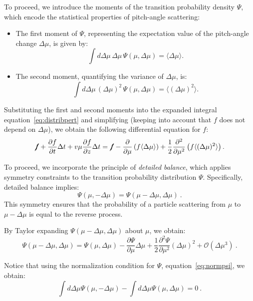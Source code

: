 To proceed, we introduce the moments of the transition probability density \( \Psi \), which encode the statistical properties of pitch-angle scattering:
%
\begin{itemize}
\item The first moment of \( \Psi \), representing the expectation value of the pitch-angle change \( \Delta \mu \), is given by:
\[
\int d\Delta \mu \, \Delta \mu \, \Psi(\mu, \Delta \mu) = \langle \Delta \mu \rangle.
\]
\item The second moment, quantifying the variance of \( \Delta \mu \), is:
\[
\int d\Delta \mu \, (\Delta \mu)^2 \, \Psi(\mu, \Delta \mu) = \langle (\Delta \mu)^2 \rangle.
\]
\end{itemize}

Substituting the first and second moments into the expanded integral equation~\eqref{eq:distribpert} and simplifying (keeping into account that  \( f \) does not depend on \( \Delta \mu \)), we obtain the following differential equation for \( f \):
%
\begin{equation}
\cancel{f} + \frac{\partial f}{\partial t} \Delta t + v \mu \frac{\partial f}{\partial z} \Delta t = 
\cancel{f} -\frac{\partial}{\partial \mu} \left( f \langle \Delta \mu \rangle \right) + \frac{1}{2} \frac{\partial^2}{\partial \mu^2} \left( f \langle (\Delta \mu)^2 \rangle \right).
\end{equation}

To proceed, we incorporate the principle of \emph{detailed balance}, which applies symmetry constraints to the transition probability distribution \( \Psi \). 
%
Specifically, detailed balance implies:
\begin{equation}
\Psi(\mu, -\Delta \mu) = \Psi(\mu - \Delta \mu, \Delta \mu)~.
\end{equation}
%
This symmetry ensures that the probability of a particle scattering from \( \mu \) to \( \mu - \Delta \mu \) is equal to the reverse process. 

By Taylor expanding \( \Psi(\mu - \Delta \mu, \Delta \mu) \) about \( \mu \), we obtain:
\begin{equation}
\Psi(\mu - \Delta \mu, \Delta \mu) = \Psi(\mu, \Delta \mu) - \frac{\partial \Psi}{\partial \mu} \Delta \mu + \frac{1}{2} \frac{\partial^2 \Psi}{\partial \mu^2} (\Delta \mu)^2 + \mathcal O(\Delta \mu^3)~.
\end{equation}

Notice that using the normalization condition for \( \Psi \), equation~\eqref{eq:normpsi}, we obtain:
\begin{equation}
\int d\Delta \mu \Psi(\mu, -\Delta \mu) - \int d\Delta \mu \Psi(\mu, \Delta \mu) = 0~.
\end{equation}


